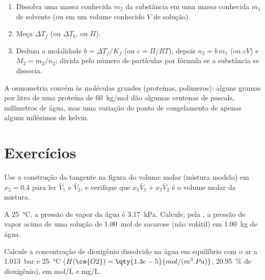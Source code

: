 \begin{method}\label{met:b2:chemical-potential:molar-mass}
\begin{enumerate}
  \item Dissolva uma massa conhecida $m_2$ da substância em uma massa conhecida $m_1$
        de solvente (ou em um volume conhecido $V$ de solução).
  \item Meça $\Delta T_f$ (ou $\Delta T_b$, ou $\Pi$).
  \item Deduza a molalidade $b = \Delta T_f/K_f$ (ou $c = \Pi/RT$), depois $n_2 =
        b\,m_1$ (ou $cV$) e $M_2 = m_2/n_2$; divida pelo número de
        partículas por fórmula se a substância se dissocia.
\end{enumerate}
A osmometria convém às moléculas grandes (proteínas, polímeros): alguns gramas
por litro de uma proteína de \qty{60}{kg/mol} dão algumas centenas de pascals,
milímetros de água, mas uma variação do ponto de congelamento de apenas
alguns milésimos de kelvin.
\end{method}

\section{Exercícios}

\begin{exercise}[$\star$]\label{exo:b2:chemical-potential:1}
Use a construção da tangente na figura do volume molar (mistura modelo)
em $x_2 = 0.4$ para ler $\bar V_1$ e $\bar V_2$, e verifique que
$x_1\bar V_1 + x_2\bar V_2$ é o volume molar da mistura.
\end{exercise}

\begin{exercise}[$\star$]\label{exo:b2:chemical-potential:2}
A \qty{25}{\celsius}, a pressão de vapor da água é \qty{3.17}{kPa}.
Calcule, pela , a pressão de vapor acima de uma solução de
\qty{1.00}{mol} de sacarose (não volátil) em \qty{1.00}{kg} de água.
\end{exercise}

\begin{exercise}[$\star$]\label{exo:b2:chemical-potential:3}
Calcule a concentração de dioxigênio dissolvido na água em equilíbrio com
o ar a \qty{1.013}{bar} e \qty{25}{\celsius} ($H(\ce{O2}) =
\qty{1.3e-5}{mol/(m^3.Pa)}$, \qty{20.95}{\percent} de dioxigênio), em
\unit{mol/L} e \unit{mg/L}.
\end{exercise}

